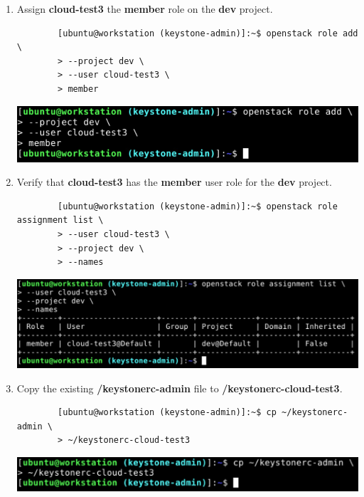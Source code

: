 \documentclass[letterpaper, 12pt]{article}
\begin{document}
\begin{enumerate}
    \item  Assign \textbf{cloud-test3} the \textbf{member} role on the \textbf{dev} project.
    \begin{lstlisting}
        [ubuntu@workstation (keystone-admin)]:~$ openstack role add \
        > --project dev \
        > --user cloud-test3 \
        > member
    \end{lstlisting}

    \begin{center}
        \includegraphics[width=\linewidth]{images/part4/step9.png}
    \end{center}

    \item Verify that \textbf{cloud-test3} has the \textbf{member} user role for the \textbf{dev} project.
    \begin{lstlisting}
        [ubuntu@workstation (keystone-admin)]:~$ openstack role assignment list \
        > --user cloud-test3 \
        > --project dev \
        > --names
    \end{lstlisting}

    \begin{center}
        \includegraphics[width=\linewidth]{images/part4/step10.png}
    \end{center}

    \item Copy the existing \textbf{\texttildemid/keystonerc-admin} file to \textbf{\texttildemid/keystonerc-cloud-test3}.
    \label{it:copy_keystone}
    \begin{lstlisting}
        [ubuntu@workstation (keystone-admin)]:~$ cp ~/keystonerc-admin \
        > ~/keystonerc-cloud-test3
    \end{lstlisting}

    \begin{center}
        \includegraphics[width=\linewidth]{images/part4/step11.png}
    \end{center}


\end{enumerate}
\end{document}
